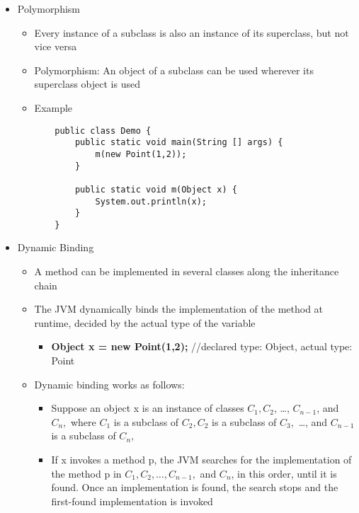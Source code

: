 \begin{itemize}
	\item Polymorphism
	\begin{itemize}
		\item Every instance of a subclass is also an instance of its superclass, but not vice versa
		\item Polymorphism: An object of a subclass can be used wherever its superclass object is used
		\item Example\\
		\begin{minipage}{0.3\textwidth}
			\centering
			\begin{Verbatim}
	public class Demo {
		public static void main(String [] args) {
			m(new Point(1,2));
		}

		public static void m(Object x) {
			System.out.println(x);
		}
	}
			\end{Verbatim}
		\end{minipage}
	\end{itemize}

	\item Dynamic Binding
	\begin{itemize}
		\item A method can be implemented in several classes along the inheritance chain
		\item The JVM dynamically binds the implementation of the method at runtime, decided by the actual type of the variable
		\begin{itemize}
			\item \textbf{Object x = new Point(1,2);} \hspace{1cm}	//declared type: Object, actual type: Point
		\end{itemize}
		\item Dynamic binding works as follows:
		\begin{itemize}
			\item Suppose an object x is an instance of classes $ C_1, C_2 $, \ldots , $ C_{n-1} $, and $ C_n, $ where $ C_1 $ is a subclass of $ C_2, C_2 $ is a subclass of $ C_3, $ \ldots , and $ C_{n-1} $ is a subclass of $ C_n, $
			\item If x invokes a method p, the JVM searches for the implementation of the method p in $ C_1, C_2, \ldots , C_{n-1}, $ and $ C_n $, in this order, until it is found. Once an implementation is found, the search stops and the first-found implementation is invoked
		\end{itemize}
	\end{itemize}


\end{itemize}
